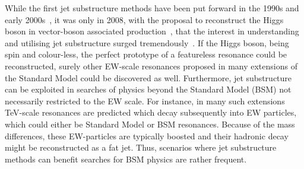 While the first jet substructure methods have been put forward in the
1990s and early
2000s~\cite{Seymour:1991cb,Seymour:1993mx,Seymour:1994by,Butterworth:2002tt},
it was only in 2008, with the proposal to reconstruct the Higgs boson
in vector-boson associated production~\cite{Butterworth:2008iy}, that
the interest in understanding and utilising jet substructure surged
tremendously~\cite{Abdesselam:2010pt,Altheimer:2012mn,Altheimer:2013yza,Adams:2015hiv,Larkoski:2017jix,Asquith:2018igt}. If
the Higgs boson, being spin and colour-less, the perfect prototype of
a featureless resonance could be reconstructed, surely other
EW-scale resonances proposed in many extensions of the Standard Model could be
discovered as well. 
%
Furthermore, jet substructure can be exploited in searches of physics beyond the Standard Model (BSM) not necessarily restricted to the EW scale. 
%
For instance, in many such extensions TeV-scale resonances are
predicted which decay subsequently into EW particles, which could either be Standard Model or BSM resonances.
%
Because of the mass differences, these EW-particles are typically
boosted and their hadronic decay might be reconstructed as a fat jet.
%
Thus, scenarios where jet substructure methods can benefit searches
for BSM physics are rather frequent.

